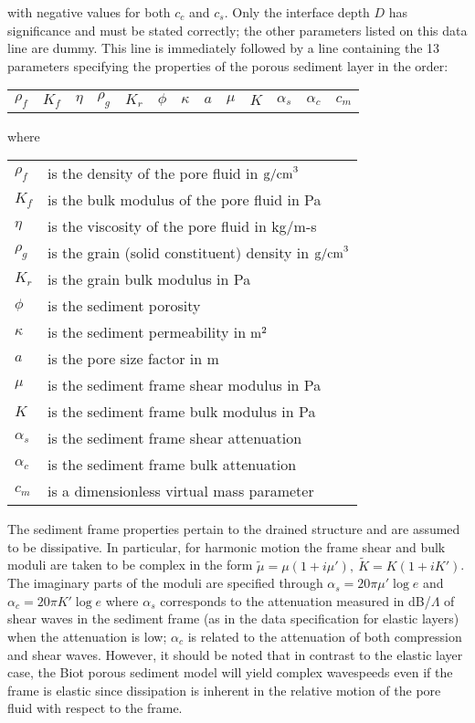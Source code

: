 \noindent with negative values for both $c_c$ and  $c_s$.  Only the
interface depth $D$ has significance and must be stated correctly; the
other parameters listed on this data line are dummy.  This line is
immediately followed by a line containing the 13 parameters specifying
the properties of the porous sediment layer in the order:

\begin{tabular}{lllllllllllll}
    $\rho_f$ & $K_f$ & $\eta$ & $\rho_g$ & $K_r$ & $\phi$ & $\kappa$ &
$a$ & $\mu$ & $K$ & $\alpha_s$ & $\alpha_c$ & $c_m$
\end{tabular}

\noindent where

\begin{tabular}{ll}
    $\rho_f$ & is the density of the pore fluid in ${\rm g/cm}^3$ \\
    $K_f$ &	is the bulk modulus of the pore fluid in Pa \\
    $\eta$ &	is the viscosity of the pore fluid in kg/m-s \\
    $\rho_g$ &	is the grain (solid constituent) density in
${\rm g/cm}^3$ \\
    $K_r$ &	is the grain bulk modulus in Pa \\
    $\phi$ &	is the sediment porosity \\
    $\kappa$ &	is the sediment permeability in ${\rm m}^2$ \\
    $a$ &	is the pore size factor in m \\
    $\mu$ &	is the sediment frame shear modulus in Pa \\
    $K$ &	is the sediment frame bulk modulus in Pa \\
    $\alpha_s$	& is the sediment frame shear attenuation \\
    $\alpha_c$	& is the sediment frame bulk attenuation \\
    $c_m$	& is a dimensionless virtual mass parameter
\end{tabular}

   	The sediment frame properties pertain to the drained structure and
are assumed to be dissipative. In particular, for harmonic motion the
frame shear and bulk moduli are taken to be complex in the form
$\tilde{\mu} = \mu (1 + i\mu'),\ \tilde{K} = K(1 + iK')$.
The imaginary parts of the moduli are specified through   $\alpha_s =
20 \pi \mu' \log{e}$  and $\alpha_c = 20 \pi K' \log{e}$  where
$\alpha_s$  corresponds to the attenuation measured in dB/$\Lambda$ of
shear  waves in the sediment frame (as in the data specification for
elastic layers) when the attenuation is low;  $\alpha_c$  is related to
the attenuation of both compression and shear waves.  However, it
should be noted that in contrast to the elastic layer case, the Biot
porous sediment model will yield complex wavespeeds even if the frame
is elastic since dissipation is inherent in the relative motion of the
pore fluid with respect to the frame.

